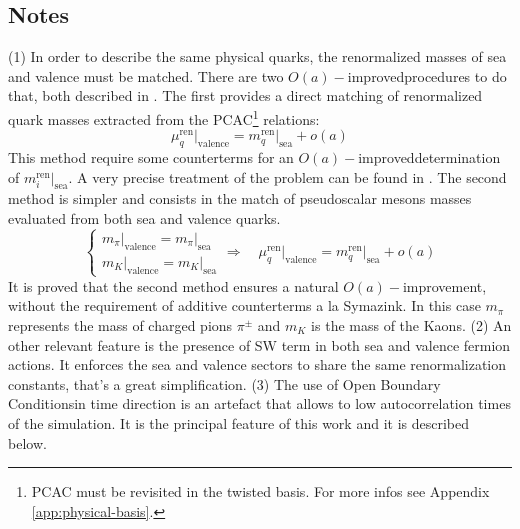 \documentclass[english, LaM, oneside, noexaminfo]{sapthesis}
\newcommand{\ren}{{\text{ren}}}
\newcommand{\oaid}{$O(a)-$improved}
\newcommand{\oait}{$O(a)-$improvement}
\newcommand{\obc}{Open Boundary Conditions}
\begin{document}
\subsection*{Notes}
\noindent
(1) In order to describe the same physical quarks, the renormalized masses of sea and valence must be matched.
There are two \oaid\space procedures to do that, both described in \cite{matching-masses}.
The first provides a direct matching of renormalized quark masses extracted from the PCAC\footnote{PCAC must be revisited in the twisted basis. For more infos see Appendix \ref{app:physical-basis}.} relations:
\begin{equation*}
    \mu_q^\ren \big|_\text{valence} = m_q^\ren \big|_\text{sea} + o(a)
\end{equation*}
This method require some counterterms for an \oaid\space determination of $m_i^\ren \big|_\text{sea}$.
A very precise treatment of the problem can be found in \cite{bussone2019matching}.
The second method is simpler and consists in the match of pseudoscalar mesons masses evaluated from both sea and valence quarks.
\begin{equation*}
    \begin{cases}
        m_\pi \big|_\text{valence} = m_\pi \big|_\text{sea} \\
        m_K \big|_\text{valence} = m_K \big|_\text{sea}
    \end{cases}
    \Longrightarrow \quad  \mu_q^\ren \big|_\text{valence} = m_q^\ren \big|_\text{sea} + o(a)
\end{equation*}
It is proved that the second method ensures a natural \oait, without the requirement of additive counterterms a la Symazink.
In this case $m_\pi$ represents the mass of charged pions $\pi^\pm$ and $m_K$ is the mass of the Kaons.
\newline
\newline
(2) An other relevant feature is the presence of SW term in both sea and valence fermion actions. 
It enforces the sea and valence sectors to share the same renormalization constants, that's a great simplification. 
\newline
\newline
(3) The use of \obc\space in time direction is an artefact that allows to low autocorrelation times of the simulation.
It is the principal feature of this work and it is described below.
\end{document}
